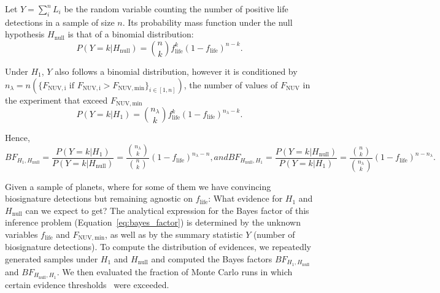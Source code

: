 \documentclass[twocolumn,twocolappendix,linenumbers]{aastex631}
\begin{document}
Let $Y=\sum_i^n L_i$ be the random variable counting the number of positive life detections in a sample of size $n$. Its probability mass function under the null hypothesis $H_\mathrm{null}$ is that of a binomial distribution:
\begin{equation}
P(Y=k|H_\mathrm{null}) = \binom{n}{k}f_\mathrm{life}^k(1-f_\mathrm{life})^{n-k}.
\end{equation}

Under $H_1$, $Y$ also follows a binomial distribution, however it is conditioned by $n_{\lambda} = n(\{F_\mathrm{NUV, i} \text{ if } F_\mathrm{NUV, i}>F_\mathrm{NUV, min}\}_{i \in [1,n]})$, the number of values of $F_\mathrm{NUV}$ in the experiment that exceed $F_\mathrm{NUV, min}$
\begin{equation}
\label{eq:semian:likelihoodH1}
P(Y=k|H_1) = \binom{n_{\lambda}}{k}f_\mathrm{life}^k(1-f_\mathrm{life})^{n_{\lambda}-k}.
\end{equation}

Hence,
\begin{subequations}
\begin{equation}\label{eq:bayes_factor}
BF_{H_1,H_\mathrm{null}} = \frac{P(Y=k|H_1)}{P(Y=k|H_\mathrm{null})} = \frac{\binom{n_\lambda}{k}}{\binom{n}{k}}(1-f_\mathrm{life})^{n_{\lambda}-n},
\end{equation}
and
\begin{equation}\label{eq:bayes_factor2}
BF_{H_\mathrm{null},H_1} = \frac{P(Y=k|H_\mathrm{null})}{P(Y=k|H_1)} = \frac{\binom{n}{k}}{\binom{n_\lambda}{k}}(1-f_\mathrm{life})^{n-n_{\lambda}}.
\end{equation}
\end{subequations}

Given a sample of planets, where for some of them we have convincing biosignature detections but remaining agnostic on $f_\mathrm{life}$: What evidence for $H_\mathrm{1}$ and $H_\mathrm{null}$ can we expect to get?
The analytical expression for the Bayes factor of this inference problem (Equation~\ref{eq:bayes_factor}) is determined by the unknown variables $f_\mathrm{life}$ and $F_\mathrm{NUV, min}$, as well as by the summary statistic $Y$ (number of biosignature detections).
To compute the distribution of evidences, we repeatedly generated samples under $H_\mathrm{1}$ and $H_\mathrm{null}$ and computed the Bayes factors $BF_{H_1,H_\mathrm{null}}$ and $BF_{H_\mathrm{null}, H_1}$.
We then evaluated the fraction of Monte Carlo runs in which certain evidence thresholds~\citep{Jeffreys1939} were exceeded.
\end{document}
